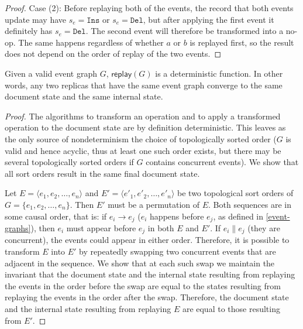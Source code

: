 \documentclass[sigplan,10pt]{acmart}
\begin{document}
\begin{proof}
  Case (2): Before replaying both of the events, the record that both events update may have $s_e = \texttt{Ins}$ or $s_e = \texttt{Del}$, but after applying the first event it definitely has $s_e = \texttt{Del}$.
  The second event will therefore be transformed into a no-op.
  The same happens regardless of whether $a$ or $b$ is replayed first, so the result does not depend on the order of replay of the two events.
\end{proof}

\begin{lemma}\label{lemma-deterministic}
  Given a valid event graph $G$, $\mathsf{replay}(G)$ is a deterministic function.
  In other words, any two replicas that have the same event graph converge to the same document state and the same internal state.
\end{lemma}
\begin{proof}
  The algorithms to transform an operation and to apply a transformed operation to the document state are by definition deterministic.
  This leaves as the only source of nondeterminism the choice of topologically sorted order ($G$ is valid and hence acyclic, thus at least one such order exists, but there may be several topologically sorted orders if $G$ contains concurrent events).
  We show that all sort orders result in the same final document state.

  Let $E = \langle e_1, e_2, \dots, e_n \rangle$ and $E' = \langle e'_1, e'_2, \dots, e'_n \rangle$ be two topological sort orders of $G = \{e_1, e_2, \dots, e_n\}$.
  Then $E'$ must be a permutation of $E$.
  Both sequences are in some causal order, that is: if $e_i \rightarrow e_j$ ($e_i$ happens before $e_j$, as defined in \autoref{event-graphs}), then $e_i$ must appear before $e_j$ in both $E$ and $E'$.
  If $e_i \parallel e_j$ (they are concurrent), the events could appear in either order.
  Therefore, it is possible to transform $E$ into $E'$ by repeatedly swapping two concurrent events that are adjacent in the sequence.
  We show that at each such swap we maintain the invariant that the document state and the internal state resulting from replaying the events in the order before the swap are equal to the states resulting from replaying the events in the order after the swap.
  Therefore, the document state and the internal state resulting from replaying $E$ are equal to those resulting from $E'$.


\end{proof}
\end{document}
